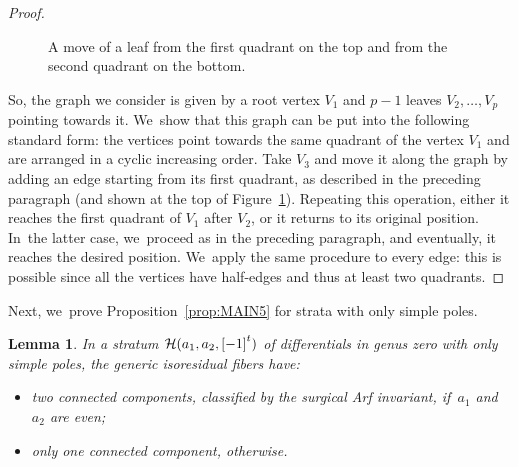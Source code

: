 \documentclass[11pt]{article}
\newtheorem{lem}[thm]{Lemma}
\theoremstyle{definition}
\begin{document}
\begin{proof}
\begin{figure}[ht]
\caption{A move of a leaf from the first quadrant on the top and from the second quadrant on the bottom.} \label{fig:operation2}
\end{figure}

So, the graph we consider is given by a root vertex $V_{1}$ and $p-1$ leaves $V_{2},\dots,V_{p}$ pointing towards it. We~show that this graph can be put into the following standard form: the vertices point towards the same quadrant of the vertex $V_{1}$ and are arranged in a cyclic increasing order. Take $V_{3}$ and move it along the graph by adding an edge starting from its first quadrant, as described in the preceding paragraph (and shown at the top of Figure~\ref{fig:operation2}). Repeating this operation, either it reaches the first quadrant of $V_{1}$ after $V_{2}$, or it returns to its original position. In~the latter case, we~proceed as in the preceding paragraph, and eventually, it reaches the desired position. We~apply the same procedure to every edge: this is possible since all the vertices have half-edges and thus at least two quadrants.
\end{proof}

Next, we~prove Proposition~\ref{prop:MAIN5} for strata with only simple poles.

\begin{lem}\label{lem:MAIN5Simple}
In a stratum $\mathcal{H}(a_{1},a_{2},\rec[-1][t])$ of differentials in genus zero with only simple poles, the generic isoresidual fibers have:
\begin{itemize}
\item two connected components, classified by the surgical Arf invariant, if~$a_{1}$ and $a_{2}$ are even;
\item only one connected component, otherwise.
\end{itemize}
\end{lem}
\end{document}
